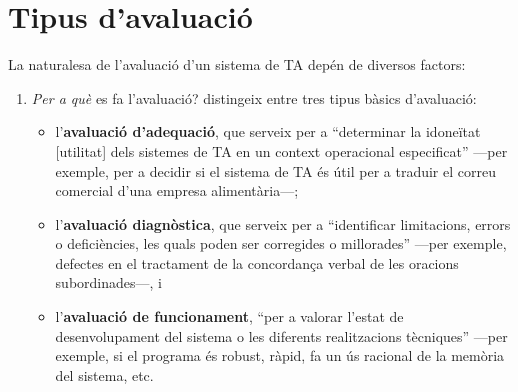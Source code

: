 \section{Tipus d'avaluació}
\label{ss:tipusaval}
La naturalesa de l'avaluació d'un sistema de TA depén de diversos
factors:
\begin{enumerate}
\item \emph{Per a què} es fa l'avaluació? \citet{hutchins96u}
  distingeix entre tres tipus bàsics d'avaluació:
  \begin{itemize}
  \item l'\textbf{avaluació d'adequació}, que serveix per a
    ``determinar la idoneïtat [utilitat] dels sistemes de TA en un
    context operacional especificat'' ---per exemple, per a decidir si
    el sistema de TA és útil per a traduir el correu comercial d'una
    empresa alimentària---;
  \item l'\textbf{avaluació diagnòstica}, que serveix per a ``identificar
    limitacions, errors o deficiències, les quals poden ser corregides
    o millorades'' ---per exemple, defectes en el tractament de la
    concordança verbal de les oracions subordinades---, i
  \item l'\textbf{avaluació de funcionament}, ``per a valorar l'estat
    de desenvolupament del sistema o les diferents realitzacions
    tècniques'' ---per exemple, si el programa és robust, ràpid, fa un
    ús racional de la memòria del sistema, etc.
  \end{itemize}


\end{enumerate}
